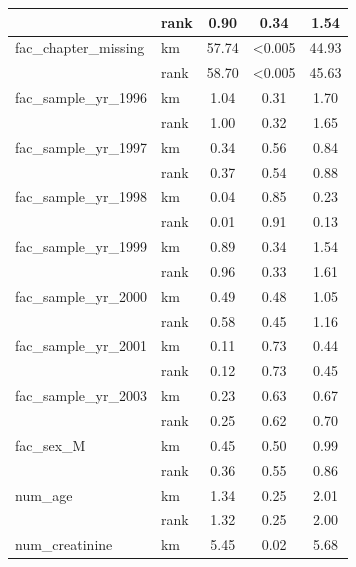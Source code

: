 \begin{table}[H]
\begin{tabular}{|l|l|c|c|c|}
                                    & rank & 0.90  & 0.34   & 1.54  \\ \hline
    fac\_chapter\_missing            & km   & 57.74 & <0.005 & 44.93 \\ \hline
                                    & rank & 58.70 & <0.005 & 45.63 \\ \hline
    fac\_sample\_yr\_1996            & km   & 1.04  & 0.31   & 1.70  \\ \hline
                                    & rank & 1.00  & 0.32   & 1.65  \\ \hline
    fac\_sample\_yr\_1997            & km   & 0.34  & 0.56   & 0.84  \\ \hline
                                    & rank & 0.37  & 0.54   & 0.88  \\ \hline
    fac\_sample\_yr\_1998            & km   & 0.04  & 0.85   & 0.23  \\ \hline
                                    & rank & 0.01  & 0.91   & 0.13  \\ \hline
    fac\_sample\_yr\_1999            & km   & 0.89  & 0.34   & 1.54  \\ \hline
                                    & rank & 0.96  & 0.33   & 1.61  \\ \hline
    fac\_sample\_yr\_2000            & km   & 0.49  & 0.48   & 1.05  \\ \hline
                                    & rank & 0.58  & 0.45   & 1.16  \\ \hline
    fac\_sample\_yr\_2001            & km   & 0.11  & 0.73   & 0.44  \\ \hline
                                    & rank & 0.12  & 0.73   & 0.45  \\ \hline
    fac\_sample\_yr\_2003            & km   & 0.23  & 0.63   & 0.67  \\ \hline
                                    & rank & 0.25  & 0.62   & 0.70  \\ \hline
    fac\_sex\_M                      & km   & 0.45  & 0.50   & 0.99  \\ \hline
                                    & rank & 0.36  & 0.55   & 0.86  \\ \hline
    num\_age                         & km   & 1.34  & 0.25   & 2.01  \\ \hline
                                    & rank & 1.32  & 0.25   & 2.00  \\ \hline
    num\_creatinine                  & km   & 5.45  & 0.02   & 5.68  \\ \hline

\end{tabular}
\end{table}
